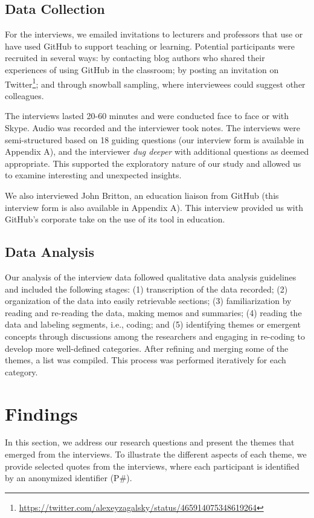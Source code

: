 \subsection{Data Collection}
For the interviews, we emailed invitations to lecturers and professors that use or have used GitHub to support teaching or learning. Potential participants were recruited in several ways: by contacting blog authors who shared their experiences of using GitHub in the classroom; by posting an invitation on Twitter\footnote{\url{https://twitter.com/alexeyzagalsky/status/465914075348619264}}; and through snowball sampling, where interviewees could suggest other colleagues.

The interviews lasted 20-60 minutes and were conducted face to face or with Skype. Audio was recorded and the interviewer took notes. The interviews were semi-structured based on 18 guiding questions (our interview form is available in Appendix A), and the interviewer \textit{dug deeper} with additional questions as deemed appropriate. This supported the exploratory nature of our study and allowed us to examine interesting and unexpected insights.

We also interviewed John Britton, an education liaison from GitHub (this interview form is also available in Appendix A). This interview provided us with GitHub's corporate take on the use of its tool in education.

\subsection{Data Analysis}
Our analysis of the interview data followed qualitative data analysis guidelines \cite{lacey2001qualitative,seaman1999qualitative} and included the following stages: (1) transcription of the data recorded; (2) organization of the data into easily retrievable sections; (3) familiarization by reading and re-reading the data, making memos and summaries; (4) reading the data and labeling segments, i.e., coding; and (5) identifying themes or emergent concepts through discussions among the researchers and engaging in re-coding to develop more well-defined categories. After refining and merging some of the themes, a list was compiled. This process was performed iteratively for each category.

\section{Findings}
\label{sec:results}
In this section, we address our research questions and present the themes that emerged from the interviews. To illustrate the different aspects of each theme, we provide selected quotes from the interviews, where each participant is identified by an anonymized identifier (P\#).


